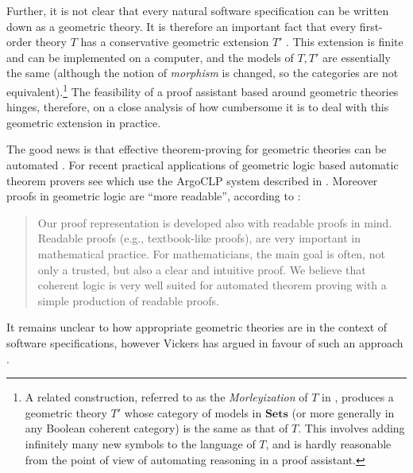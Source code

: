 \documentclass[english,letter paper,12pt,reqno]{article}
\theoremstyle{example}
\begin{document}
Further, it is not clear that every natural software specification can be written down as a geometric theory. It is therefore an important fact that every first-order theory $T$ has a conservative geometric extension $T'$ \cite[Theorem 7.7]{negri}. This extension is finite and can be implemented on a computer, and the models of $T,T'$ are essentially the same (although the notion of \emph{morphism} is changed, so the categories are not equivalent).\footnote{A related construction, referred to as the \emph{Morleyization} of $T$ in \cite[D1.5.13]{johnstone}, produces a geometric theory $T'$ whose category of models in $\textbf{Sets}$ (or more generally in any Boolean coherent category) is the same as that of $T$. This involves adding infinitely many new symbols to the language of $T$, and is hardly reasonable from the point of view of automating reasoning in a proof assistant.} The feasibility of a proof assistant based around geometric theories hinges, therefore, on a close analysis of how cumbersome it is to deal with this geometric extension in practice.

The good news is that effective theorem-proving for geometric theories can be automated \cite{bezem, bezem2, bezem3, fisher, holen, nivelle, stojanovic}. For recent practical applications of geometric logic based automatic theorem provers see \cite{marinkovic, durdevic} which use the ArgoCLP system described in \cite{stojanovic}. Moreover proofs in geometric logic are ``more readable'', according to \cite{stojanovic2}:
\begin{quote}
Our proof representation is developed also with readable proofs in mind.
Readable proofs (e.g., textbook-like proofs), are very important in mathematical
practice. For mathematicians, the main goal is often, not only a trusted, but also
a clear and intuitive proof. We believe that coherent logic is very well suited for
automated theorem proving with a simple production of readable proofs.
\end{quote}
It remains unclear to how appropriate geometric theories are in the context of software specifications, however Vickers has argued in favour of such an approach \cite{vickers1,vickers2}.
\end{document}
